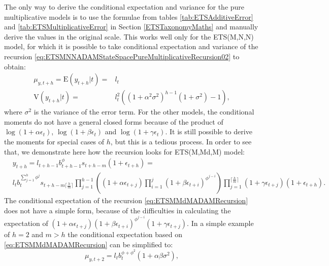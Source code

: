 \documentclass[]{book}
\theoremstyle{definition}
\theoremstyle{definition}
\theoremstyle{definition}
\theoremstyle{definition}
\theoremstyle{remark}
\begin{document}
The only way to derive the conditional expectation and variance for the pure multiplicative models is to use the formulae from tables \ref{tab:ETSAdditiveError} and \ref{tab:ETSMultiplicativeError} in Section \ref{ETSTaxonomyMaths} and manually derive the values in the original scale. This works well only for the ETS(M,N,N) model, for which it is possible to take conditional expectation and variance of the recursion \eqref{eq:ETSMNNADAMStateSpacePureMultiplicativeRecursion02} to obtain:
\begin{equation}
    \begin{aligned}
        \mu_{y,t+h} = \mathrm{E}(y_{t+h}|t) = & l_{t} \\
        \mathrm{V}(y_{t+h}|t) = & l_{t}^2 \left(  \left(1+ \alpha^2 \sigma^2 \right)^{h-1} (1 + \sigma^2) -1 \right),
    \end{aligned}
    \label{eq:ETSMNNADAMConditionalValues}
\end{equation}
where \(\sigma^2\) is the variance of the error term. For the other models, the conditional moments do not have a general closed forms because of the product of \(\log(1+\alpha\epsilon_t)\), \(\log(1+\beta\epsilon_t)\) and \(\log(1+\gamma\epsilon_t)\). It is still possible to derive the moments for special cases of \(h\), but this is a tedious process. In order to see that, we demonstrate here how the recursion looks for ETS(M,Md,M) model:
\begin{equation}
    \begin{aligned}
        & y_{t+h} = l_{t+h-1} b_{t+h-1}^\phi s_{t+h-m} \left(1 + \epsilon_{t+h} \right) = \\
        & l_{t} b_{t}^{\sum_{j=1}^h{\phi^j}} s_{t+h-m\lceil\frac{h}{m}\rceil} \prod_{j=1}^{h-1} \left( (1 + \alpha \epsilon_{t+j}) \prod_{i=1}^{j} (1 + \beta \epsilon_{t+i})^{\phi^{j-i}} \right) \prod_{j=1}^{\lceil\frac{h}{m}\rceil} \left(1 + \gamma \epsilon_{t+j}\right) \left(1 + \epsilon_{t+h} \right) .
    \end{aligned}
    \label{eq:ETSMMdMADAMRecursion}
\end{equation}
The conditional expectation of the recursion \eqref{eq:ETSMMdMADAMRecursion} does not have a simple form, because of the difficulties in calculating the expectation of \((1 + \alpha \epsilon_{t+j})(1 + \beta \epsilon_{t+i})^{\phi^{j-i}}(1 + \gamma \epsilon_{t+j})\). In a simple example of \(h=2\) and \(m>h\) the conditional expectation based on \eqref{eq:ETSMMdMADAMRecursion} can be simplified to:
\begin{equation}
    \mu_{y,t+2} = l_{t} b_{t}^{\phi+\phi^2} \left(1 + \alpha \beta \sigma^2 \right),
    \label{eq:ETSMMdMADAMRecursionHorizon2}
\end{equation}
\end{document}
